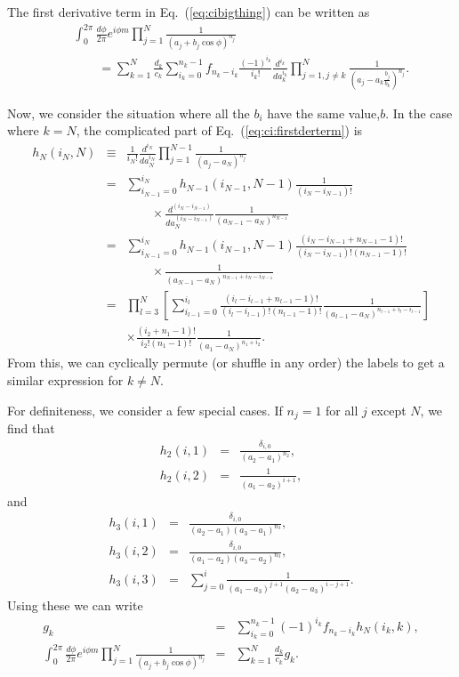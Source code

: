 \documentclass[aps,prc,preprint,tightenlines]{revtex4}
\begin{document}
The first derivative term in Eq.~(\ref{eq:cibigthing}) can be written as
\begin{eqnarray}
&&\int_0^{2\pi} \frac{d\phi}{2\pi} e^{i \phi m} 
\prod_{j=1}^N \frac{1}{(a_j + b_j \cos\phi)^{n_j}} \nonumber\\
&&\qquad=
\sum_{k=1}^N \frac{d_k}{c_k} \sum_{i_k=0}^{n_k-1} f_{n_k-i_k}
\frac{(-1)^{i_k}}{i_k!} \frac{d^{i_k}}{d a_k^{i_k}}
\prod_{j=1,j\neq k}^N \frac{1}{\left(a_j-a_k
\frac{b_j}{b_k}\right)^{n_j}}.
\label{eq:ci:firstderterm}
\end{eqnarray}

Now, we consider the situation where all the $b_i$ have the same
value,$b$. In the case where $k=N$, the complicated part of
Eq.~(\ref{eq:ci:firstderterm}) is 
\begin{eqnarray}
h_N(i_N,N)
&\equiv& \frac{1}{i_N!} \frac{d^{i_N}}{d a_N^{i_N}}
\prod_{j=1}^{N-1} \frac{1}{(a_j-a_N)^{n_j}} \\
&=& \sum_{i_{N-1}=0}^{i_N} h_{N-1}(i_{N-1},N-1)
\frac{1}{(i_N-i_{N-1})!} 
\nonumber\\&&\qquad\times
\frac{d^{(i_N-i_{N-1})}}{d a_N^{(i_N-i_{N-1})}}
\frac{1}{(a_{N-1}-a_N)^{n_{N-1}}} \\
&=& \sum_{i_{N-1}=0}^{i_N} h_{N-1}(i_{N-1},N-1)
\frac{(i_N-i_{N-1}+  n_{N-1}-1)!}
     {(i_N-i_{N-1})!(n_{N-1}-1)!}
\nonumber\\&&\qquad\times
\frac{1}{(a_{N-1}-a_N)^{n_{N-1}+i_N-i_{N-1}}} \\
&=& \prod_{l=3}^N
\left[
\sum_{i_{l-1}=0}^{i_l}
\frac{(i_l-i_{l-1}+  n_{l-1}-1)!}
     {(i_l-i_{l-1})!(n_{l-1}-1)!} \frac{1}{(a_{l-1}-a_N)^{n_{l-1}+i_l-i_{l-1}}}
\right]
\\&&\times
\frac{(i_2+n_1-1)!}{i_2!(n_1-1)!} \frac{1}{(a_1-a_N)^{n_1+i_2}}.
\end{eqnarray}
From this, we can cyclically permute (or shuffle in any
order) the labels to get a similar expression for $k\neq N$.

For definiteness, we consider a few special cases. If $n_j=1$ for all
$j$ except $N$, we find that
\begin{eqnarray}
h_2(i,1) &=& \frac{\delta_{i,0}}{(a_2-a_1)^{n_2}}, \\
h_2(i,2) &=& \frac{1}{(a_1-a_2)^{i+1}},
\end{eqnarray}
and
\begin{eqnarray}
h_3(i,1) &=& \frac{\delta_{i,0}}{(a_2-a_1)(a_3-a_1)^{n_3}}, \\
h_3(i,2) &=& \frac{\delta_{i,0}}{(a_1-a_2)(a_3-a_2)^{n_3}}, \\
h_3(i,3) &=& \sum_{j=0}^i \frac{1}{(a_1-a_3)^{j+1}(a_2-a_3)^{i-j+1}}.
\end{eqnarray}
Using these we can write
\begin{eqnarray}
g_k &=& \sum_{i_k=0}^{n_k-1} (-1)^{i_k} f_{n_k-i_k} h_N(i_k,k), \\
\int_0^{2\pi} \frac{d\phi}{2\pi} e^{i \phi m} 
\prod_{j=1}^N \frac{1}{(a_j + b_j \cos\phi)^{n_j}}
&=& \sum_{k=1}^N \frac{d_k}{c_k} g_k.
\end{eqnarray}
\end{document}
